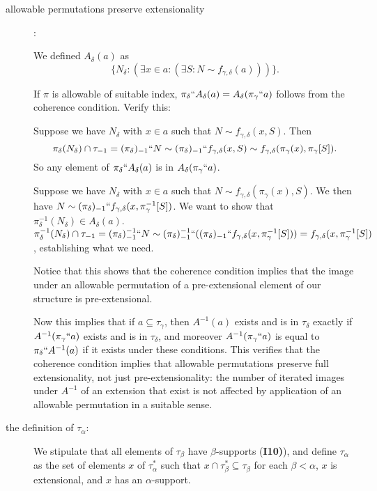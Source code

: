 \documentclass[112pt]{article}
\begin{document}
\begin{description}
\item[allowable permutations preserve extensionality]:

  We defined $A_\delta(a)$ as $$\{N_\delta:(\exists x \in a:(\exists S:N \sim f_{\gamma,\delta}(a)))\}.$$

If $\pi$ is allowable of suitable index, $\pi_\delta``A_\delta(a)= A_\delta(\pi_\gamma``a)$ follows from the coherence condition.  Verify this:

Suppose we have $N_\delta$ with $x \in a$ such that $N \sim f_{\gamma,\delta}(x,S)$.  Then $$\pi_\delta(N_\delta)  \cap \tau_{-1} = (\pi_\delta)_{-1}``N \sim (\pi_\delta)_{-1}``f_{\gamma,\delta}(x,S) \sim f_{\gamma,\delta}(\pi_\gamma(x),\pi_\gamma[S]).$$  So any element of $\pi_\delta``A_\delta(a)$ is in $A_\delta(\pi_\gamma``a)$.

Suppose we have $N_\delta$ with $x \in a$ such that $N \sim f_{\gamma,\delta}(\pi_\gamma(x),S)$.  We then have $N \sim (\pi_\delta)_{-1}``f_{\gamma,\delta}(x,\pi_\gamma^{-1}[S])$.  We want to show that $\pi_\delta^{-1}(N_\delta) \in A_\delta(a)$.  $\pi_\delta^{-1}(N_\delta) \cap \tau_{-1} = (\pi_\delta)_{-1}^{-1}``N \sim 
(\pi_\delta)_{-1}^{-1}``((\pi_\delta)_{-1}``f_{\gamma,\delta}(x,\pi_\gamma^{-1}[S])) = f_{\gamma,\delta}(x,\pi_\gamma^{-1}[S])$, establishing what we need.

Notice that this shows that the coherence condition implies that the image under an allowable permutation of a pre-extensional element of our structure is pre-extensional.

Now this implies that if $a \subseteq \tau_\gamma$, then $A^{-1}(a)$ exists and is in $\tau_\delta$ exactly if $A^{-1}(\pi_\gamma``a)$ exists and is in $\tau_\delta$, and moreover $A^{-1}(\pi_\gamma``a)$ is equal to $\pi_\delta``A^{-1}(a)$ if it exists under these conditions.  This verifies that the coherence condition implies that allowable permutations preserve full extensionality, not just pre-extensionality:  the number of iterated images under $A^{-1}$ of an extension that exist is not affected by application of an allowable permutation in a suitable sense.



\item[the definition of $\tau_\alpha$:]  We stipulate that all elements of $\tau_\beta$ have $\beta$-supports ({\bf I10)}), and define $\tau_\alpha$ as the set of elements $x$ of $\tau^*_\alpha$ such that
$x \cap \tau^*_{\beta} \subseteq \tau_\beta$ for each $\beta<\alpha$, $x$ is extensional, and $x$ has an $\alpha$-support.


\end{description}
\end{document}

